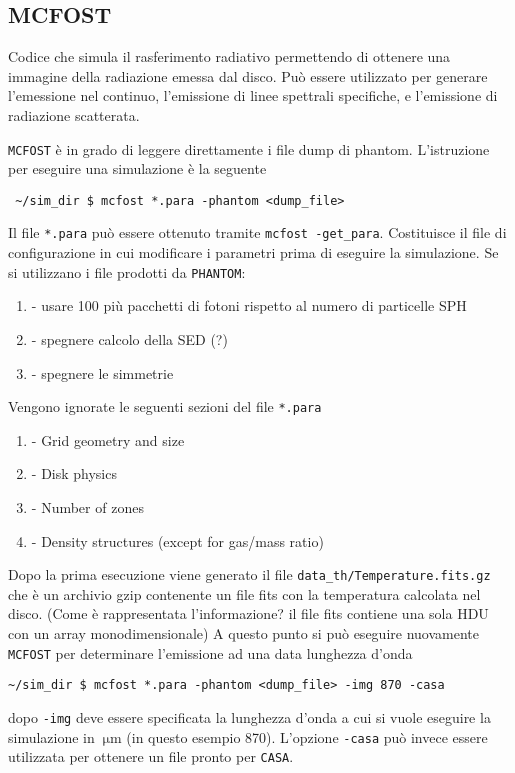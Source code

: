 \documentclass[DIN, pagenumber=false, fontsize=11pt, parskip=half]{scrartcl}
\begin{document}
\subsection{MCFOST}
Codice che simula il rasferimento radiativo permettendo di ottenere una immagine della radiazione emessa dal disco.
Può essere utilizzato per generare l'emessione nel continuo, l'emissione di linee spettrali specifiche, e l'emissione di radiazione scatterata.

\lstinline{MCFOST} è in grado di leggere direttamente i file dump di phantom. L'istruzione per eseguire una simulazione è la seguente

\begin{lstlisting}
 ~/sim_dir $ mcfost *.para -phantom <dump_file>
\end{lstlisting}

Il file \lstinline{*.para} può essere ottenuto tramite \lstinline{mcfost -get_para}. Costituisce il file di configurazione in cui modificare i parametri prima di eseguire la simulazione. Se si utilizzano i file prodotti da \lstinline{PHANTOM}:
\begin{enumerate}
 \item[-] usare 100 più pacchetti di fotoni rispetto al numero di particelle SPH 
 \item[-] spegnere calcolo della SED (?)
 \item[-] spegnere le simmetrie
\end{enumerate}
Vengono ignorate le seguenti sezioni del file \lstinline{*.para}
\begin{enumerate}
 \item[-] Grid geometry and size
 \item[-] Disk physics
 \item[-] Number of zones
 \item[-] Density structures (except for gas/mass ratio)
\end{enumerate}

Dopo la prima esecuzione viene generato il file \lstinline{data_th/Temperature.fits.gz} che è un archivio gzip contenente un file fits con la temperatura calcolata nel disco. (Come è rappresentata l'informazione? il file fits contiene una sola HDU con un array monodimensionale)
A questo punto si può eseguire nuovamente \lstinline{MCFOST} per determinare l'emissione ad una data lunghezza d'onda 
\begin{lstlisting}
~/sim_dir $ mcfost *.para -phantom <dump_file> -img 870 -casa
\end{lstlisting}
dopo \lstinline{-img} deve essere specificata la lunghezza d'onda a cui si vuole eseguire la simulazione in $\SI{}{\micro\m}$ (in questo esempio 870). L'opzione \lstinline{-casa} può invece essere utilizzata per ottenere un file pronto per \lstinline{CASA}.
\end{document}

